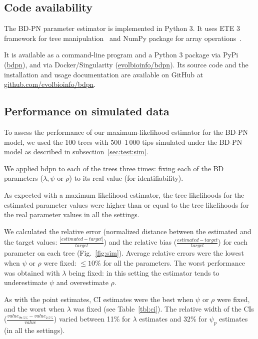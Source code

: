 \documentclass[a4paper,10pt]{article}
\begin{document}
\subsection*{Code availability}
The BD-PN parameter estimator is implemented in Python 3. It uses ETE 3 framework for tree manipulation~\citep{Huerta-Cepas2016} and NumPy package for array operations~\citep{harris_array_2020}. 

It is available as a command-line program and a Python 3 package via PyPi (\href{https://pypi.org/project/bdpn}{bdpn}), and via Docker/Singularity (\href{https://hub.docker.com/r/evolbioinfo/bdpn/tags}{evolbioinfo/bdpn}). Its source code and the installation and usage documentation are available on GitHub at \href{https://github.com/evolbioinfo/bdpn}{github.com/evolbioinfo/bdpn}.

\subsection{Performance on simulated data}

To assess the performance of our maximum-likelihood estimator for the BD-PN model, we used the 100 trees with 500--1\,000 tips simulated under the BD-PN model as described in subsection~\ref{sec:test:sim}.

We applied bdpn to each of the trees three times: fixing each of the BD parameters ($\lambda,\psi$ or $\rho$) to its real value (for identifiability). 


As expected with a maximum likelihood estimator, the tree likelihoods for the estimated parameter values were higher than or equal to the tree likelihoods for the real parameter values in all the settings.

We calculated the relative error (normalized distance between the estimated and the target values: $\frac{|estimated - target|}{target}$) and the relative bias ($\frac{estimated - target}{target}$) for each parameter on each tree (Fig.~\ref{fig:sim}). 
Average relative errors were the lowest when $\psi$ or $\rho$ were fixed: $\leq 10\%$  for all the parameters. The worst performance was obtained with $\lambda$ being fixed: in this setting the estimator tends to underestimate $\psi$ and overestimate $\rho$.

As with the point estimates, CI estimates were the best when $\psi$ or $\rho$ were fixed, and the worst when $\lambda$ was fixed (see Table~\ref{tbl:ci}). The relative width of the CIs ($\frac{value_{97.5\%} - value_{2.5\%}}{value}$) varied between 11\% for $\lambda$ estimates and 32\% for $\psi_p$ estimates (in all the settings).
\end{document}
